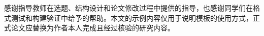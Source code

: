 \ujsbodyfont
感谢指导教师在选题、结构设计和论文修改过程中提供的指导，也感谢同学们在格式测试和构建验证中给予的帮助。本文的示例内容仅用于说明模板的使用方式，正式论文应替换为作者本人完成且经过核验的研究内容。
